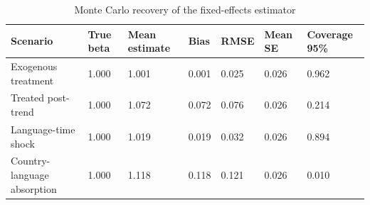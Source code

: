 \begin{table}[!htbp]
\centering
\caption{Monte Carlo recovery of the fixed-effects estimator}
\label{tab:sim_monte_carlo}
\small
\begin{tabular}{lllllll}
\toprule
Scenario & True beta & Mean estimate & Bias & RMSE & Mean SE & Coverage 95\% \\
\midrule
Exogenous treatment & 1.000 & 1.001 & 0.001 & 0.025 & 0.026 & 0.962 \\
Treated post-trend & 1.000 & 1.072 & 0.072 & 0.076 & 0.026 & 0.214 \\
Language-time shock & 1.000 & 1.019 & 0.019 & 0.032 & 0.026 & 0.894 \\
Country-language absorption & 1.000 & 1.118 & 0.118 & 0.121 & 0.026 & 0.010 \\
\bottomrule
\end{tabular}
\end{table}
